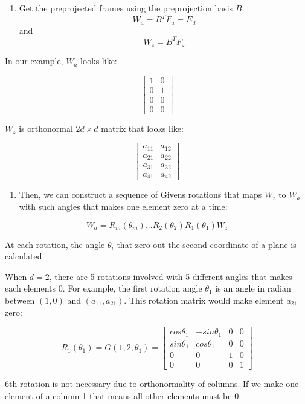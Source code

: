 \begin{enumerate}
\def\labelenumi{\arabic{enumi}.}
\setcounter{enumi}{1}
\tightlist
\item
  Get the preprojected frames using the preprojection basis \(B\).
  \[W_a = B^TF_a = E_d\] and \[W_z = B^TF_z\]
\end{enumerate}

In our example, \(W_a\) looks like:

\[ \begin{bmatrix}1 & 0 \\0  &1 \\ 0&0 \\0&0\end{bmatrix} \]

\(W_z\) is orthonormal \(2d\times d\) matrix that looks like:

\[ \begin{bmatrix} a_{11} & a_{12} \\a_{21}  &a_{22} \\ a_{31}&a_{32} \\a_{41}&a_{42}\end{bmatrix} \]

\begin{enumerate}
\def\labelenumi{\arabic{enumi}.}
\setcounter{enumi}{2}
\tightlist
\item
  Then, we can construct a sequence of Givens rotations that maps \(W_z\) to \(W_a\) with such angles that makes one element zero at a time:
\end{enumerate}

\[ W_a = R_m(\theta_m) ... R_2(\theta_2)R_1(\theta_1)W_z\]

At each rotation, the angle \(\theta_i\) that zero out the second coordinate of a plane is calculated.

When \(d = 2\), there are 5 rotations involved with 5 different angles that makes each elements 0. For example, the first rotation angle \(\theta_1\) is an angle in radian between \((1, 0)\) and \((a_{11}, a_{21})\). This rotation matrix would make element \(a_{21}\) zero:

\[R_1(\theta_1) = G(1, 2, \theta_1) = \begin{bmatrix} cos\theta_1 & -sin\theta_1 & 0 & 0 \\sin\theta_1  &cos\theta_1 & 0 &0 \\ 0&0&1&0 \\0&0&0&1\end{bmatrix}\]

6th rotation is not necessary due to orthonormality of columns. If we make one element of a column 1 that means all other elements must be 0.

